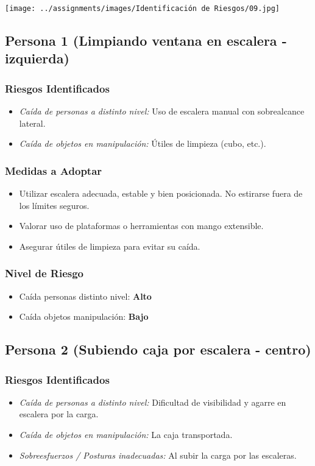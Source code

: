 \documentclass[12pt,a4paper]{article}
\begin{document}
	\texttt{[image: ../assignments/images/Identificación de Riesgos/09.jpg]}
	
	\subsection{Persona 1 (Limpiando ventana en escalera - izquierda)}
	
	\subsubsection{Riesgos Identificados}
	\begin{itemize}
		\item \textit{Caída de personas a distinto nivel:} Uso de escalera manual con sobrealcance lateral.
		\item \textit{Caída de objetos en manipulación:} Útiles de limpieza (cubo, etc.).
	\end{itemize}
	
	\subsubsection{Medidas a Adoptar}
	\begin{itemize}
		\item Utilizar escalera adecuada, estable y bien posicionada. No estirarse fuera de los límites seguros.
		\item Valorar uso de plataformas o herramientas con mango extensible.
		\item Asegurar útiles de limpieza para evitar su caída.
	\end{itemize}
	
	\subsubsection{Nivel de Riesgo}
	\begin{itemize}
		\item Caída personas distinto nivel: \textbf{Alto}
		\item Caída objetos manipulación: \textbf{Bajo}
	\end{itemize}
	
	\bigskip\hrulefill\bigskip
	
	\subsection{Persona 2 (Subiendo caja por escalera - centro)}
	
	\subsubsection{Riesgos Identificados}
	\begin{itemize}
		\item \textit{Caída de personas a distinto nivel:} Dificultad de visibilidad y agarre en escalera por la carga.
		\item \textit{Caída de objetos en manipulación:} La caja transportada.
		\item \textit{Sobreesfuerzos / Posturas inadecuadas:} Al subir la carga por las escaleras.
	\end{itemize}
	
\end{document}
